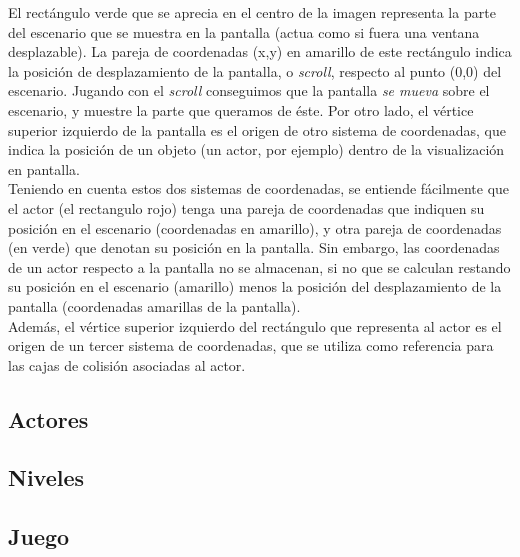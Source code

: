 El rectángulo verde que se aprecia en el centro de la imagen representa la parte del escenario que se muestra en la pantalla (actua como si fuera una ventana desplazable). La pareja de coordenadas (x,y) en amarillo de este rectángulo indica la posición de desplazamiento de la pantalla, o \emph{scroll}, respecto al punto (0,0) del escenario. Jugando con el \emph{scroll} conseguimos que la pantalla \emph{se mueva} sobre el escenario, y muestre la parte que queramos de éste. Por otro lado, el vértice superior izquierdo de la pantalla es el origen de otro sistema de coordenadas, que indica la posición de un objeto (un actor, por ejemplo) dentro de la visualización en pantalla.\\

Teniendo en cuenta estos dos sistemas de coordenadas, se entiende fácilmente que el actor (el rectangulo rojo) tenga una pareja de coordenadas que indiquen su posición en el escenario (coordenadas en amarillo), y otra pareja de coordenadas (en verde) que denotan su posición en la pantalla. Sin embargo, las coordenadas de un actor respecto a la pantalla no se almacenan, si no que se calculan restando su posición en el escenario (amarillo) menos la posición del desplazamiento de la pantalla (coordenadas amarillas de la pantalla).\\

Además, el vértice superior izquierdo del rectángulo que representa al actor es el origen de un tercer sistema de coordenadas, que se utiliza como referencia para las cajas de colisión asociadas al actor.

\subsection{Actores}


\subsection{Niveles}


\subsection{Juego}


\clearpage

